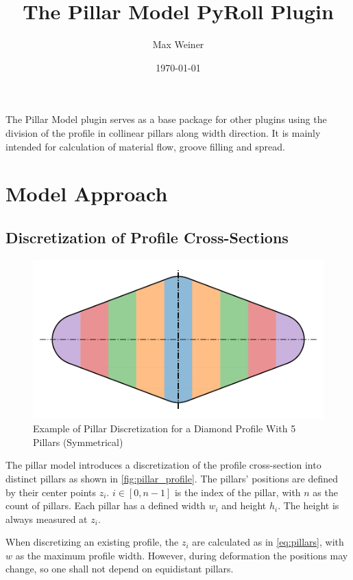 \documentclass[11pt]{PyRollDocs}
\begin{document}
    \title{The Pillar Model PyRoll Plugin}
    \author{Max Weiner}
    \date{\today}

    \maketitle

    The Pillar Model plugin serves as a base package for other plugins using the division of the profile in collinear pillars along width direction.
    It is mainly intended for calculation of material flow, groove filling and spread.


    \section{Model Approach}\label{sec:model-approach}

    \subsection{Discretization of Profile Cross-Sections}\label{subsec:discretization-of-profile-cross-sections}

    \begin{figure}
        \centering
        \includegraphics[width=0.6\linewidth]{img/pillar_profile}
        \caption{Example of Pillar Discretization for a Diamond Profile With 5 Pillars (Symmetrical)}
        \label{fig:pillar_profile}
    \end{figure}

    The pillar model introduces a discretization of the profile cross-section into distinct pillars as shown in \autoref{fig:pillar_profile}.
    The pillars' positions are defined by their center points $z_i$.
    $i \in [0, n - 1]$ is the index of the pillar, with $n$ as the count of pillars.
    Each pillar has a defined width $w_i$ and height $h_i$.
    The height is always measured at $z_i$.

    When discretizing an existing profile, the $z_i$ are calculated as in \autoref{eq:pillars}, with $w$ as the maximum profile width.
    However, during deformation the positions may change, so one shall not depend on equidistant pillars.
\end{document}
